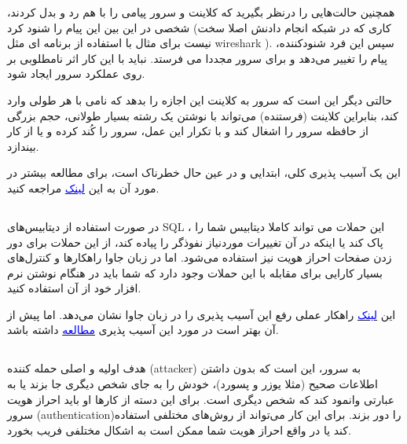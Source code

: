 \documentclass[]{article}
\begin{document}
همچنین حالت‌هایی را درنظر بگیرید که کلاینت و سرور پیامی را با هم رد و بدل کردند،‌ شخصی در این بین این پیام را شنود کرد (‌کاری که در شبکه انجام دادنش اصلا سخت نیست برای مثال با استفاده از برنامه ای مثل wireshark ). سپس این فرد شنودکننده،‌ پیام را تغییر می‌دهد و برای سرور مجددا می فرستد. نباید با این کار اثر نامطلوبی بر روی عملکرد سرور ایجاد شود.

\bigskip

حالتی دیگر این است که سرور به کلاینت این اجازه را بدهد که نامی با هر طولی وارد کند، بنابراین کلاینت (فرستنده)‌ می‌تواند با نوشتن یک رشته بسیار طولانی، حجم بزرگی از حافظه سرور را اشغال کند و با تکرار این عمل،‌ سرور را کُند کرده و یا از کار بیندازد.

این یک آسیب پذیری کلی، ابتدایی و در عین حال خطرناک است،‌ برای مطالعه بیشتر در مورد آن به این \href {https://cwe.mitre.org/data/definitions/20.html}{\textcolor{blue}{لینک}} مراجعه کنید.




\subsection*{{}}
در صورت استفاده از دیتابیس‌های SQL ، این حملات می تواند کاملا دیتابیس شما را پاک کند یا اینکه در آن تغییرات مورد‌نیاز نفوذگر را پیاده کند، از این حملات برای دور زدن صفحات احراز هویت نیز استفاده می‌شود. اما در زبان جاوا راهکار‌ها و کنترل‌های بسیار کارایی برای مقابله با این حملات وجود دارد که شما باید در هنگام نوشتن نرم افزار خود از آن استفاده کنید.

این \href {"https://software-security.sans.org/developer-how-to/fix-sql-injection-in-java-using-prepared-callable-statement"}{\textcolor{blue}{لینک}}  راهکار عملی رفع این آسیب پذیری را در زبان جاوا نشان می‌دهد. اما پیش از آن بهتر است در مورد این آسیب پذیری \href {https://www.w3schools.com/sql/sql_injection.asp}{\textcolor{blue}{مطالعه}} داشته باشد.



\subsection*{{}}
هدف اولیه و اصلی حمله کننده (attacker) به سرور، این است که بدون داشتن اطلاعات صحیح (مثلا یوزر و پسورد)، خودش را به جای شخص دیگری جا بزند یا به عبارتی وانمود کند که شخص دیگری است. برای این دسته از کارها او باید احراز هویت سرور (authentication)‌را دور بزند. برای این کار می‌تواند از روش‌های مختلفی استفاده کند یا در واقع احراز هویت شما ممکن است به اشکال مختلفی فریب بخورد.
\end{document}
